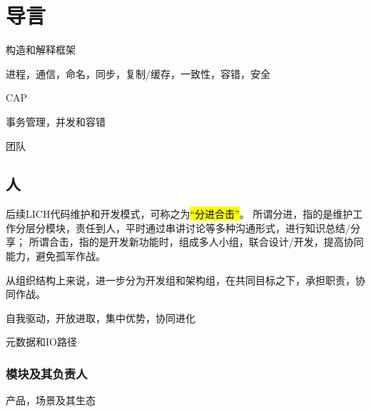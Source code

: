 \chapter{导言}

构造和解释框架

进程，通信，命名，同步，复制/缓存，一致性，容错，安全

CAP

事务管理，并发和容错

团队

\section{人}

后续LICH代码维护和开发模式，可称之为\hl{“分进合击”}。
所谓分进，指的是维护工作分层分模块，责任到人，平时通过串讲讨论等多种沟通形式，进行知识总结/分享；
所谓合击，指的是开发新功能时，组成多人小组，联合设计/开发，提高协同能力，避免孤军作战。

从组织结构上来说，进一步分为开发组和架构组，在共同目标之下，承担职责，协同作战。

自我驱动，开放进取，集中优势，协同进化

元数据和IO路径

\subsection{模块及其负责人}

产品，场景及其生态

